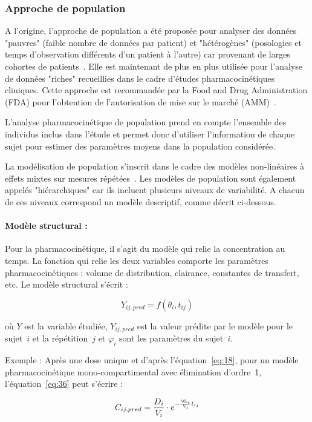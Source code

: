 \subsubsection{Approche de population}
A l'origine, l'approche de population a été proposée pour analyser des données "pauvres" (faible nombre de données par patient) et "hétérogènes" (posologies et temps d'observation différents d'un patient à l'autre) car provenant de larges cohortes de patients~\citep{REF8}. Elle est maintenant de plus en plus utilisée pour l'analyse de données "riches" recueillies dans le cadre d'études pharmacocinétiques cliniques. Cette approche est recommandée par la Food and Drug Administration (FDA) pour l'obtention de l'autorisation de mise sur le marché (\gls{AMM})~\citep{REF9}.

L'analyse pharmacocinétique de population prend en compte l'ensemble des individus inclus dans l'étude et permet donc d'utiliser l'information de chaque sujet pour estimer des paramètres moyens dans la population considérée.

La modélisation de population s'inscrit dans le cadre des modèles non-linéaires à effets mixtes sur mesures répétées~\citep{REF10}. Les modèles de population sont également appelés "hiérarchiques" car ils incluent plusieurs niveaux de variabilité. A chacun de ces niveaux correspond un modèle descriptif, comme décrit ci-dessous.

\paragraph*{Modèle structural :} Pour la pharmacocinétique, il s'agit du modèle qui relie la concentration au temps. La fonction qui relie les deux variables comporte les paramètres pharmacocinétiques : volume de distribution, clairance, constantes de transfert, etc. Le modèle structural s'écrit :

\begin{equation}
Y_{ij,pred} = f(\theta_i ,t_{ij})
\label{eq:36}
\end{equation}

où $Y$ est la variable étudiée, $Y_{ij,pred}$ est la valeur prédite par le modèle pour le sujet~$i$ et la répétition~$j$ et $\varphi_i$ sont les paramètres du sujet~$i$.

Exemple : Après une dose unique et d'après l'équation~\ref{eq:18}, pour un modèle pharmacocinétique mono-compartimental avec élimination d'ordre~1, l'équation~\ref{eq:36} peut s'écrire :

\begin{equation}
C_{ij,pred} = \frac{D_i}{V_i} \cdot e^{-\frac{\CL_i}{V_i}t_{ij}}
\label{eq:37}
\end{equation}

